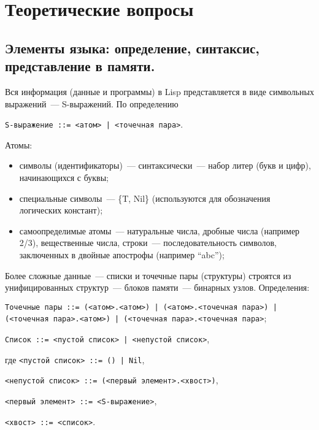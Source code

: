 \chapter{Теоретические вопросы}

\section{Элементы языка: определение, синтаксис, представление в памяти.}

Вся информация (данные и программы) в Lisp представляется в виде символьных выражений~--- S-выражений. По определению
\begin{center}
	\texttt{S-выражение ::= <атом> | <точечная пара>}.
\end{center}

Атомы:
\begin{itemize}
	\item символы (идентификаторы)~--- синтаксически~--- набор литер (букв и цифр), начинающихся с буквы;
	\item специальные символы~--- \{T, Nil\} (используются для обозначения логических констант);
	\item самоопределимые атомы~--- натуральные числа, дробные числа (например 2/3), вещественные числа, строки~--- последовательность символов, заключенных в двойные апострофы (например ``abc'');
\end{itemize}

Более сложные данные~--- списки и точечные пары (структуры) строятся из унифицированных структур~--- блоков памяти~--- бинарных узлов.
Определения:

\begin{flushleft}
	\texttt{Точечные пары ::= (<атом>.<атом>) | (<атом>.<точечная пара>) | (<точечная пара>.<атом>) | (<точечная пара>.<точечная пара>};
\end{flushleft}

\begin{flushleft}
	\texttt{Список ::= <пустой список> | <непустой список>}, 
	
	где \texttt{<пустой список> ::= () | Nil},
		
	\hspace{6.8mm} \texttt{<непустой список> ::= (<первый элемент>.<хвост>)},
		
	\hspace{6.8mm} \texttt{<первый элемент> ::= <S-выражение>},
		
	\hspace{6.8mm} \texttt{<хвост> ::= <список>}.
\end{flushleft}

